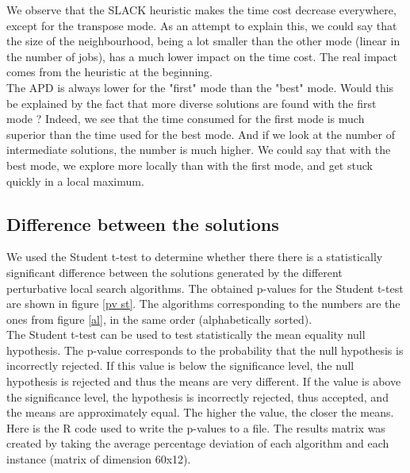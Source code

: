 We observe that the SLACK heuristic makes the time cost decrease everywhere, except for the transpose mode. As an attempt to explain this, we could say that the size of the neighbourhood, being a lot smaller than the other mode (linear in the number of jobs), has a much lower impact on the time cost. The real impact comes from the heuristic at the beginning.\\

The APD is always lower for the "first" mode than the "best" mode. Would this be explained by the fact that more diverse solutions are found with the first mode ? Indeed, we see that the time consumed for the first mode is much superior than the time used for the best mode. And if we look at the number of intermediate solutions, the number is much higher. We could say that with the best mode, we explore more locally than with the first mode, and get stuck quickly in a local maximum.

\subsection{Difference between the solutions}
We used the Student t-test to determine whether there there is a statistically significant difference between the solutions generated by the different perturbative local search algorithms. The obtained p-values for the Student t-test are shown in figure \ref{pv st}. The algorithms corresponding to the numbers are the ones from figure \ref{al}, in the same order (alphabetically sorted).\\

The Student t-test can be used to test statistically the mean equality null hypothesis. The p-value corresponds to the probability that the null hypothesis is incorrectly rejected. If this value is below the significance level, the null hypothesis is rejected and thus the means are very different. If the value is above the significance level, the hypothesis is incorrectly rejected, thus accepted, and the means are approximately equal. The higher the value, the closer the means.\\

Here is the R code used to write the p-values to a file. The results matrix was created by taking the average percentage deviation of each algorithm and each instance (matrix of dimension 60x12).

